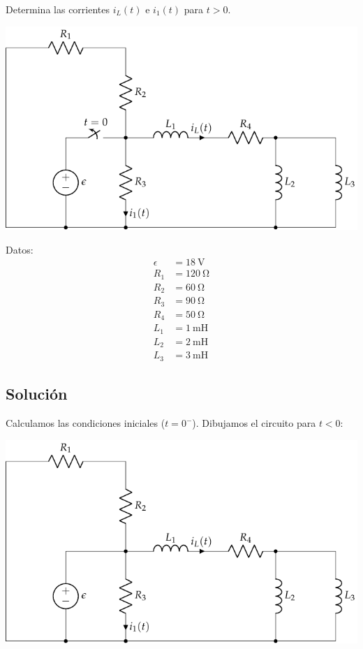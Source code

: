 Determina las corrientes $i_L(t)$ e $i_1(t)$ para $t > 0$.

\begin{minipage}{0.7\textwidth}
  \includegraphics{figuras/HKD84}
\end{minipage}
\hfill
\begin{minipage}{0.3\textwidth}
  Datos:
  \begin{align*}
    \epsilon &= \SI{18}{\volt}\\
    R_1 &= \SI{120}{\ohm}\\
    R_2 &= \SI{60}{\ohm}\\
    R_3 &= \SI{90}{\ohm}\\
    R_4 &= \SI{50}{\ohm}\\
    L_1 &= \SI{1}{\milli\henry}\\
    L_2 &= \SI{2}{\milli\henry}\\
    L_3 &= \SI{3}{\milli\henry}
  \end{align*}
\end{minipage}

\subsection*{Solución}

Calculamos las condiciones iniciales ($t = 0^-$). 
Dibujamos el circuito para $t < 0$:

\begin{center}
  \includegraphics[scale=0.9]{figuras/HKD84_t0-}
\end{center}

